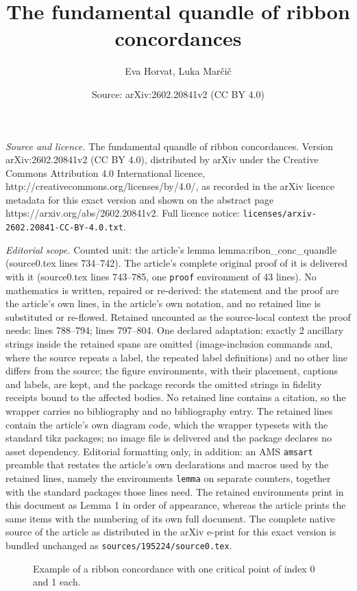 \documentclass[10pt,a4paper]{amsart}
\title{The fundamental quandle of ribbon concordances}
\author{Eva Horvat, Luka Mar\v{c}i\v{c}}
\date{Source: arXiv:2602.20841v2 (CC BY 4.0)}
\begin{document}
\maketitle

\noindent\emph{Source and licence.} The fundamental quandle of ribbon concordances. Version arXiv:2602.20841v2 (CC BY 4.0), distributed by arXiv under the Creative Commons Attribution 4.0 International licence, http://creativecommons.org/licenses/by/4.0/, as recorded in the arXiv licence metadata for this exact version and shown on the abstract page https://arxiv.org/abs/2602.20841v2. Full licence notice: \texttt{licenses/arxiv-2602.20841-CC-BY-4.0.txt}.\par\smallskip

\noindent\textit{Editorial scope.} Counted unit: the article's lemma lemma:ribon\_conc\_quandle (source0.tex lines 734--742). The article's complete original proof of it is delivered with it (source0.tex lines 743--785, one \texttt{proof} environment of 43 lines). No mathematics is written, repaired or re-derived: the statement and the proof are the article's own lines, in the article's own notation, and no retained line is substituted or re-flowed.  Retained uncounted as the source-local context the proof needs: lines 788--794; lines 797--804.  One declared adaptation: exactly 2 ancillary strings inside the retained spans are omitted (image-inclusion commands and, where the source repeats a label, the repeated label definitions) and no other line differs from the source; the figure environments, with their placement, captions and labels, are kept, and the package records the omitted strings in fidelity receipts bound to the affected bodies.  No retained line contains a citation, so the wrapper carries no bibliography and no bibliography entry.  The retained lines contain the article's own diagram code, which the wrapper typesets with the standard tikz packages; no image file is delivered and the package declares no asset dependency.  Editorial formatting only, in addition: an AMS \texttt{amsart} preamble that restates the article's own declarations and macros used by the retained lines, namely the environments \texttt{lemma} on separate counters, together with the standard packages those lines need.  The retained environments print in this document as Lemma 1 in order of appearance, whereas the article prints the same items with the numbering of its own full document.  The complete native source of the article as distributed in the arXiv e-print for this exact version is bundled unchanged as \texttt{sources/195224/source0.tex}.
\begin{figure}[ht]
	\centering
	
	\caption{Example of a ribbon concordance with one critical point of index 0 and 1 each.}
	\label{fig:ribbon_conc}
\end{figure}
\end{document}
